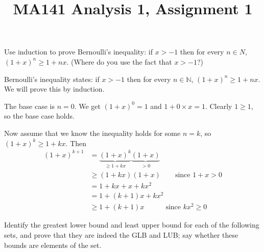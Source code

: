 \documentclass[a4paper]{article}
\title{MA141 Analysis 1, Assignment 1}
\begin{document}
\maketitle

\setlength{\parindent}{0em}
\setlength{\parskip}{1em}


\begin{questionbody}
Use induction to prove Bernoulli’s inequality: if $x > -1$ then for every $n \in N$, $(1 + x)^n \ge 1 + nx$. (Where do you use the fact that $x > -1$?)
\end{questionbody}

Bernoulli's inequality states: if $x > -1$ then for every $n \in \mathbb{N}$, $(1 + x)^n \ge 1 + nx$. We will prove this by induction.

The base case is $n = 0$. We get $(1 + x)^0 = 1$ and $1 + 0 \times x = 1$. Clearly $1 \ge 1$, so the base case holds.

Now assume that we know the inequality holds for some $n = k$, so $(1 + x)^k \ge 1 + kx$. Then
\begin{align*}
	(1 + x)^{k+1} &= \underbrace{(1 + x)^k}_{\ge 1 + kx} \underbrace{(1 + x)}_{> 0}\\[1ex]
				  &\ge (1 + kx) (1 + x) \qquad\text{since } 1 + x > 0 \\[1ex]
				  &= 1 + kx + x + kx^2\\[1ex]
				  &= 1 + (k+1)x + kx^2\\[1ex]
				  &\ge 1 + (k+1)x \qquad\quad\text{since }kx^2 \ge 0
\end{align*}

%
%


\begin{questionbody}
Identify the greatest lower bound and least upper bound for each of the following sets, and prove that they are indeed the GLB and LUB; say whether these bounds are elements of the set.
\end{questionbody}
\end{document}
